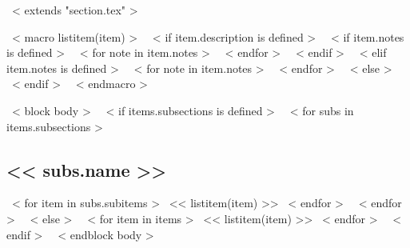 ~< extends "section.tex" >~

~< macro listitem(item) >~
  ~< if item.description is defined >~
    ~< if item.notes is defined >~
      ~< for note in item.notes >~
      ~< endfor >~
    ~< endif >~
  ~< elif item.notes is defined >~
    ~< for note in item.notes >~
    ~< endfor >~
  ~< else >~
  ~< endif >~
~< endmacro >~

~< block body >~
  ~< if items.subsections is defined >~
    ~< for subs in items.subsections >~
      \subsection{<< subs.name >>}
        ~< for item in subs.subitems >~
          << listitem(item) >>
        ~< endfor >~
    ~< endfor >~
  ~< else >~
    ~< for item in items >~
      << listitem(item) >>
    ~< endfor >~
  ~< endif >~
~< endblock body >~

